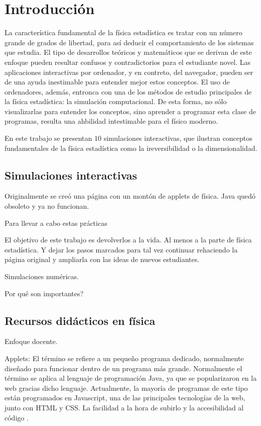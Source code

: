 \documentclass[11pt, a4paper]{article} %
\theoremstyle{named}
\begin{document}
\newpage
\section{Introducción}
\label{sec:intro}

La característica fundamental de la física estadística es tratar con un número grande de grados de libertad, para así deducir el comportamiento de los sistemas que estudia. El tipo de desarrollos teóricos y matemáticos que se derivan de este enfoque pueden resultar confusos y contradictorios para el estudiante novel. Las aplicaciones interactivas por ordenador, y en contreto, del navegador, pueden ser de una ayuda inestimable para entender mejor estos conceptos. El uso de ordenadores, además, entronca con una de los métodos de estudio principales de la física estadística: la simulación computacional. De esta forma, no sólo visualizarlas para entender los conceptos, sino aprender a programar esta clase de programas, resulta una ahbilidad intestimable para el físico moderno.

En este trabajo se presentan $10$ simulaciones interactivas, que ilustran conceptos fundamentales de la física estadística como la ireversibilidad o la dimensionalidad.

\subsection{Simulaciones interactivas}
\label{sec:sims}

Originalmente se creó una página con un montón de applets de física. Java quedó obsoleto y ya no funcionan.

Para llevar a cabo estas prácticas

El objetivo de este trabajo es devolverlos a la vida. Al menos a la parte de física estadística. Y dejar los pasos marcados para tal vez continuar rehaciendo la página original y ampliarla con las ideas de nuevos estudiantes.

Simulaciones numéricas.

Por qué son importantes?

\subsection{Recursos didácticos en física}

Enfoque docente.

Applets: El término se refiere a un pequeño programa dedicado, normalmente diseñado para funcionar dentro de un programa más grande. Normalmente el término se aplica al lenguaje de programación Java, ya que se popularizaron en la web gracias dicho lenguaje.  Actualmente, la mayoría de programas de este tipo están programados en Javascript, una de las principales tecnologías de la web, junto con HTML y CSS. La facilidad a la hora de subirlo y la accesibilidad al código \cite{schroeder}.
\end{document}

